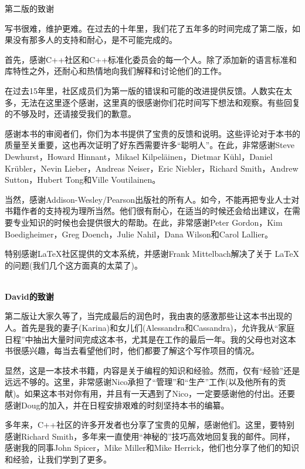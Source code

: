 \begin{flushright}
 第二版的致谢
\end{flushright}

写书很难，维护更难。在过去的十年里，我们花了五年多的时间完成了第二版，如果没有那多人的支持和耐心，是不可能完成的。

首先，感谢C++社区和C++标准化委员会的每一个人。除了添加新的语言标准和库特性之外，还耐心和热情地向我们解释和讨论他们的工作。

在过去15年里，社区成员们为第一版的错误和可能的改进提供反馈。人数实在太多，无法在这里逐个感谢，这里真的很感谢你们花时间写下想法和观察。有些回复的不够及时，还请接受我们的歉意。

感谢本书的审阅者们，你们为本书提供了宝贵的反馈和说明。这些评论对于本书的质量至关重要，这也再次证明了好东西需要许多“聪明人”。在此，非常感谢Steve Dewhurst，Howard Hinnant，Mikael Kilpel{\"a}inen，Dietmar K{\"u}hl，Daniel Kr{\"u}bler，Nevin Lieber，Andreas Neiser，Eric Niebler，Richard Smith，Andrew Sutton，Hubert Tong和Ville Voutilainen。

当然，感谢Addison-Wesley/Pearson出版社的所有人。如今，不能再把专业人士对书籍作者的支持视为理所当然。他们很有耐心，在适当的时候还会给出建议，在需要专业知识的时候也会提供很大的帮助。在此，非常感谢Peter Gordon，Kim Boedigheimer，Greg Doench，Julie Nahil，Dana
Wilson和Carol Lallier。

特别感谢LaTeX社区提供的文本系统，并感谢Frank Mittelbach解决了关于 \LaTeX 的问题(我们几个这方面真的太菜了)。

\hspace*{\fill} \\ %
\noindent\textbf{David的致谢}

第二版让大家久等了，当完成最后的润色时，我由衷的感激那些让这本书出现的人。首先是我的妻子(Karina)和女儿们(Alessandra和Cassandra)，允许我从“家庭日程”中抽出大量时间完成这本书，尤其是在工作的最后一年。我的父母也对这本书很感兴趣，每当去看望他们时，他们都要了解这个写作项目的情况。

显然，这是一本技术书籍，内容是关于编程的知识和经验。然而，仅有“经验”还是远远不够的。这里，非常感谢Nico承担了“管理”和“生产”工作(以及他所有的贡献)。如果这本书对你有用，并且有一天遇到了Nico，一定要感谢他的付出。还要感谢Doug的加入，并在日程安排艰难的时刻坚持本书的编纂。

多年来，C++社区的许多开发者也分享了宝贵的见解，感谢他们。这里，要特别感谢Richard Smith，多年来一直使用“神秘的”技巧高效地回复我的邮件。同样，感谢我的同事John Spicer，Mike Miller和Mike Herrick，他们也分享了他们的知识和经验，让我们学到了更多。

